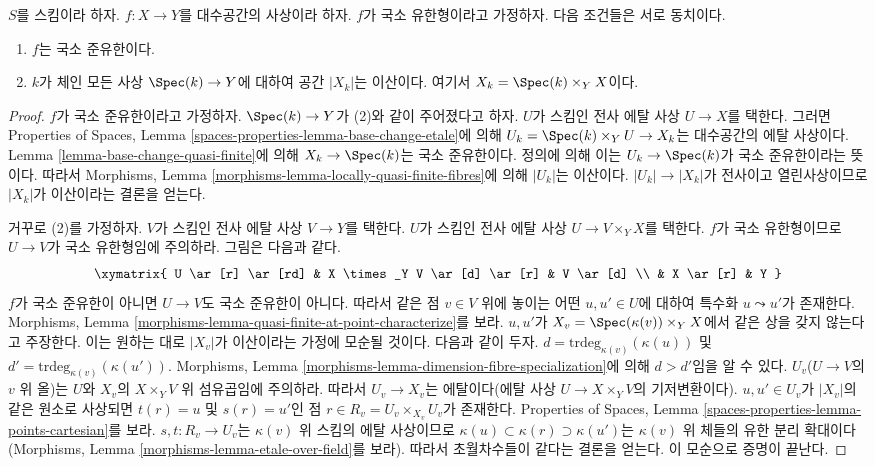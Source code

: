\begin{lemma}
\label{lemma-locally-quasi-finite}
$S$를 스킴이라 하자. $f : X \to Y$를 대수공간의 사상이라 하자.
$f$가 국소 유한형이라고 가정하자. 다음 조건들은 서로 동치이다.
\begin{enumerate}
\item $f$는 국소 준유한이다.
\item $k$가 체인 모든 사상 $\Spec(k) \to Y$에 대하여 공간
$|X_k|$는 이산이다. 여기서 $X_k = \Spec(k) \times_Y X$이다.
\end{enumerate}
\end{lemma}

\begin{proof}
$f$가 국소 준유한이라고 가정하자. $\Spec(k) \to Y$가 (2)와 같이
주어졌다고 하자. $U$가 스킴인 전사 에탈 사상 $U \to X$를 택한다.
그러면 Properties of Spaces, Lemma
\ref{spaces-properties-lemma-base-change-etale}에 의해
$U_k = \Spec(k) \times_Y U \to X_k$는 대수공간의 에탈 사상이다.
Lemma \ref{lemma-base-change-quasi-finite}에 의해
$X_k \to \Spec(k)$는 국소 준유한이다. 정의에 의해 이는
$U_k \to \Spec(k)$가 국소 준유한이라는 뜻이다.
따라서 Morphisms, Lemma
\ref{morphisms-lemma-locally-quasi-finite-fibres}에 의해
$|U_k|$는 이산이다. $|U_k| \to |X_k|$가 전사이고 열린사상이므로
$|X_k|$가 이산이라는 결론을 얻는다.

\medskip\noindent
거꾸로 (2)를 가정하자. $V$가 스킴인 전사 에탈 사상
$V \to Y$를 택한다. $U$가 스킴인 전사 에탈 사상
$U \to V \times_Y X$를 택한다. $f$가 국소 유한형이므로
$U \to V$가 국소 유한형임에 주의하라. 그림은 다음과 같다.
$$
\xymatrix{
U \ar[r] \ar[rd] & X \times_Y V \ar[d] \ar[r] & V \ar[d] \\
& X \ar[r] & Y
}
$$
$f$가 국소 준유한이 아니면 $U \to V$도 국소 준유한이 아니다.
따라서 같은 점 $v \in V$ 위에 놓이는 어떤 $u, u' \in U$에 대하여
특수화 $u \leadsto u'$가 존재한다. Morphisms, Lemma
\ref{morphisms-lemma-quasi-finite-at-point-characterize}를 보라.
$u, u'$가 $X_v = \Spec(\kappa(v)) \times_Y X$에서 같은 상을
갖지 않는다고 주장한다. 이는 원하는 대로 $|X_v|$가 이산이라는
가정에 모순될 것이다. 다음과 같이 두자.
$d = \text{trdeg}_{\kappa(v)}(\kappa(u))$ 및
$d' = \text{trdeg}_{\kappa(v)}(\kappa(u'))$.
Morphisms, Lemma
\ref{morphisms-lemma-dimension-fibre-specialization}에 의해
$d > d'$임을 알 수 있다.
$U_v$($U \to V$의 $v$ 위 올)는 $U$와 $X_v$의
$X \times_Y V$ 위 섬유곱임에 주의하라. 따라서
$U_v \to X_v$는 에탈이다(에탈 사상
$U \to X \times_Y V$의 기저변환이다).
$u, u' \in U_v$가 $|X_v|$의 같은 원소로 사상되면
$t(r) = u$ 및 $s(r) = u'$인 점
$r \in R_v = U_v \times_{X_v} U_v$가 존재한다.
Properties of Spaces, Lemma
\ref{spaces-properties-lemma-points-cartesian}를 보라.
$s, t : R_v \to U_v$는 $\kappa(v)$ 위 스킴의 에탈 사상이므로
$\kappa(u) \subset \kappa(r) \supset \kappa(u')$는
$\kappa(v)$ 위 체들의 유한 분리 확대이다
(Morphisms, Lemma \ref{morphisms-lemma-etale-over-field}를 보라).
따라서 초월차수들이 같다는 결론을 얻는다.
이 모순으로 증명이 끝난다.
\end{proof}

